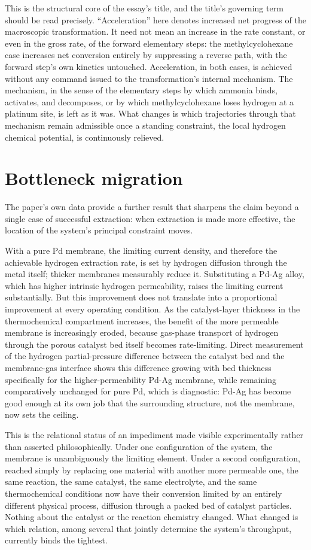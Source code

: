 \documentclass[11pt]{article}
\begin{document}
This is the structural core of the essay's title, and the title's governing term should be read precisely. ``Acceleration'' here denotes increased net progress of the macroscopic transformation. It need not mean an increase in the rate constant, or even in the gross rate, of the forward elementary steps: the methylcyclohexane case increases net conversion entirely by suppressing a reverse path, with the forward step's own kinetics untouched. Acceleration, in both cases, is achieved without any command issued to the transformation's internal mechanism. The mechanism, in the sense of the elementary steps by which ammonia binds, activates, and decomposes, or by which methylcyclohexane loses hydrogen at a platinum site, is left as it was. What changes is which trajectories through that mechanism remain admissible once a standing constraint, the local hydrogen chemical potential, is continuously relieved.

\section{Bottleneck migration}

The paper's own data provide a further result that sharpens the claim beyond a single case of successful extraction: when extraction is made more effective, the location of the system's principal constraint moves.

With a pure Pd membrane, the limiting current density, and therefore the achievable hydrogen extraction rate, is set by hydrogen diffusion through the metal itself; thicker membranes measurably reduce it. Substituting a Pd-Ag alloy, which has higher intrinsic hydrogen permeability, raises the limiting current substantially. But this improvement does not translate into a proportional improvement at every operating condition. As the catalyst-layer thickness in the thermochemical compartment increases, the benefit of the more permeable membrane is increasingly eroded, because gas-phase transport of hydrogen through the porous catalyst bed itself becomes rate-limiting. Direct measurement of the hydrogen partial-pressure difference between the catalyst bed and the membrane-gas interface shows this difference growing with bed thickness specifically for the higher-permeability Pd-Ag membrane, while remaining comparatively unchanged for pure Pd, which is diagnostic: Pd-Ag has become good enough at its own job that the surrounding structure, not the membrane, now sets the ceiling.

This is the relational status of an impediment made visible experimentally rather than asserted philosophically. Under one configuration of the system, the membrane is unambiguously the limiting element. Under a second configuration, reached simply by replacing one material with another more permeable one, the same reaction, the same catalyst, the same electrolyte, and the same thermochemical conditions now have their conversion limited by an entirely different physical process, diffusion through a packed bed of catalyst particles. Nothing about the catalyst or the reaction chemistry changed. What changed is which relation, among several that jointly determine the system's throughput, currently binds the tightest.
\end{document}
